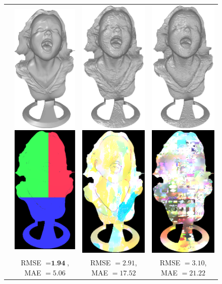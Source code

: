 \begin{figure}
{\begin{tabular}{cccc}
\multirow{-15}{*}{\parbox[t]{2.5mm}{}} &    
 \includegraphics[height=0.25\linewidth]{figures/result/comp_ratio_rgb_shape.pdf}
 \includegraphics[height=0.25\linewidth]{figures/result/comp_ratio_rgb_albedo.pdf} &
 \includegraphics[height=0.25\linewidth]{figures/result/comp_ratio_pattern_shape.pdf} 
\includegraphics[height=0.25\linewidth]{figures/result/comp_ratio_pattern_albedo.pdf} &
\includegraphics[height=0.25\linewidth]{figures/result/comp_ratio_love_shape.pdf} 
\includegraphics[height=0.25\linewidth]{figures/result/comp_ratio_love_albedo.pdf} \\
& {\small RMSE $= \textbf{1.94}$, MAE $=5.06$} & {\small RMSE $= 2.91$, MAE $=17.52$} & {\small RMSE $= 3.10$, MAE $=21.22$} \\


\end{tabular}}
\end{figure}
